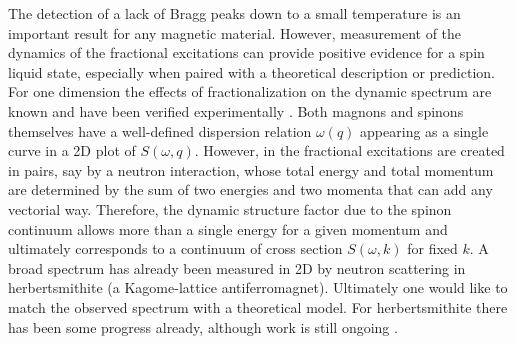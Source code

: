 \documentclass[aps,pra,preprint,groupedaddress]{revtex4-1}
\newcommand{\1}{\mathds{1}}
\begin{document}
The detection of a lack of Bragg peaks down to a small temperature is an important result for any magnetic material. However, measurement of the dynamics of the fractional excitations can provide positive evidence for a spin liquid state, especially when paired with a theoretical description or prediction. For one dimension the effects of fractionalization on the dynamic spectrum are known and have been verified experimentally \cite{Mourigal}. Both magnons and spinons themselves have a well-defined dispersion relation $\omega(q)$ appearing as a single curve in a 2D plot of $S(\omega,q)$. However, in the fractional excitations are created in pairs, say by a neutron interaction, whose total energy and total momentum are determined by the sum of two energies and two momenta that can add any vectorial way. Therefore, the dynamic structure factor due to the spinon continuum allows more than a single energy for a given momentum and ultimately corresponds to a continuum of cross section $S(\omega,k)$ for fixed $k$. A broad spectrum has already been measured in 2D by neutron scattering in herbertsmithite \cite{Han} (a Kagome-lattice antiferromagnet). Ultimately one would like to match the observed spectrum with a theoretical model. For herbertsmithite there has been some progress already, although work is still ongoing \cite{Punk}. %
 
\end{document}
